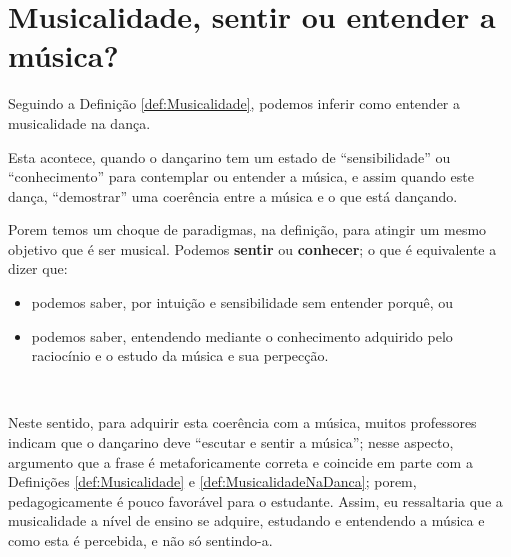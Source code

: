 
\section{Musicalidade, sentir ou entender a música?}
Seguindo a Definição \ref{def:Musicalidade}, podemos inferir como entender a musicalidade na dança.
\begin{definition} 
\label{def:MusicalidadeNaDanca}
Esta acontece, quando o dançarino tem um estado de ``sensibilidade'' ou ``conhecimento'' para contemplar ou entender a música,
e assim quando este dança, ``demostrar'' uma coerência entre a música e o que está dançando.
\end{definition}

Porem temos um choque de paradigmas, na definição, para atingir um mesmo objetivo que é ser musical.
Podemos \textbf{sentir} ou \textbf{conhecer}; o que é equivalente a dizer que:
\begin{itemize} 
\item podemos saber, por intuição e sensibilidade sem entender porquê, ou
\item podemos saber, entendendo mediante o conhecimento adquirido pelo raciocínio e o estudo da música e sua perpecção.
\end{itemize}~



Neste sentido, para adquirir esta coerência com a música, 
muitos professores indicam que o dançarino deve ``escutar e sentir a música'';
nesse aspecto, argumento que a frase é metaforicamente correta e coincide em parte com 
a Definições \ref{def:Musicalidade} e \ref{def:MusicalidadeNaDanca};
porem, pedagogicamente  é pouco favorável para o estudante.
Assim, eu ressaltaria que a musicalidade a nível de ensino se adquire,
estudando e entendendo a música e como esta é percebida, e não só sentindo-a.
 
